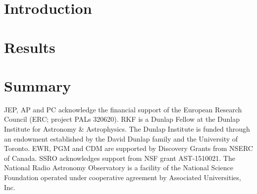 \documentclass[preprint2]{aastex6}
\begin{document}

\section{Introduction}

\section{Results}


\section{Summary}
\label{sec:summary}


\acknowledgments
JEP, AP and PC acknowledge the financial support of the European Research Council (ERC; project PALs 320620). 
%
RKF is a Dunlap Fellow at the Dunlap Institute for Astronomy \& Astrophysics. The Dunlap Institute is funded through an endowment established by the David Dunlap family and the University of Toronto. 
%
EWR, PGM and CDM are supported by Discovery Grants from NSERC of Canada. 
%
SSRO acknowledges support from NSF grant AST-1510021. 
%
The National Radio Astronomy Observatory is a facility of the National Science Foundation operated under cooperative agreement by Associated Universities, Inc. 
%




\end{document}
